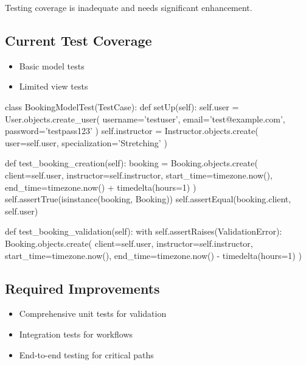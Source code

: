 \begin{tcolorbox}[
    enhanced,
    title={~50\% Complete},
    attach boxed title to top left,
    boxed title style={
        colback=danger!50,
        colframe=danger!50,
        arc=0mm,
    },
    colback=white,
    colframe=danger!50,
    arc=0mm,
    fonttitle=\bfseries
]
    Testing coverage is inadequate and needs significant enhancement.
\end{tcolorbox}

\subsection{Current Test Coverage}
\begin{itemize}
    \item Basic model tests
    \item Limited view tests
\end{itemize}

\begin{tcolorbox}[
    enhanced,
    title={Example: Current Test Implementation},
    attach boxed title to top left,
    boxed title style={
        colback=primary!50,
        colframe=primary!50,
        arc=0mm,
    },
    colback=white,
    colframe=primary!50,
    arc=0mm,
    fonttitle=\bfseries
]
class BookingModelTest(TestCase):
    def setUp(self):
        self.user = User.objects.create_user(
            username='testuser',
            email='test@example.com',
            password='testpass123'
        )
        self.instructor = Instructor.objects.create(
            user=self.user,
            specialization='Stretching'
        )
        
    def test_booking_creation(self):
        booking = Booking.objects.create(
            client=self.user,
            instructor=self.instructor,
            start_time=timezone.now(),
            end_time=timezone.now() + timedelta(hours=1)
        )
        self.assertTrue(isinstance(booking, Booking))
        self.assertEqual(booking.client, self.user)
        
    def test_booking_validation(self):
        with self.assertRaises(ValidationError):
            Booking.objects.create(
                client=self.user,
                instructor=self.instructor,
                start_time=timezone.now(),
                end_time=timezone.now() - timedelta(hours=1)
            )
\end{tcolorbox}

\subsection{Required Improvements}
\begin{itemize}
    \item Comprehensive unit tests for validation
    \item Integration tests for workflows
    \item End-to-end testing for critical paths
\end{itemize}

